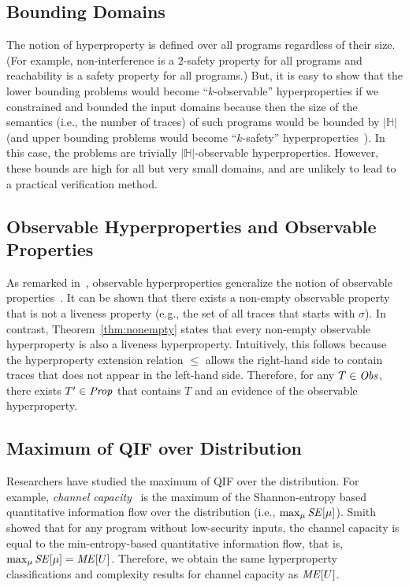 \documentclass[]{eptcs}
\begin{document}
\subsection{Bounding Domains}

\label{sec:bounddomain}
The notion of hyperproperty is defined over all programs regardless of
their size. (For example, non-interference is a $2$-safety property
for all programs and reachability is a safety property for all
programs.) But, it is easy to show that the lower bounding problems
would become ``$k$-observable'' hyperproperties if we constrained and
bounded the input domains because then the size of the semantics
(i.e., the number of traces) of such programs would be bounded by
$|\mathbb{H}|$ (and upper bounding problems would become
``$k$-safety''
hyperproperties~\cite{DBLP:conf/esorics/YasuokaT10}). In this case,
the problems are trivially $|\mathbb{H}|$-observable hyperproperties.
However, these bounds are high for all but very small domains, and are
unlikely to lead to a practical verification method.


\subsection{Observable Hyperproperties and Observable Properties}
As remarked in~\cite{DBLP:journals/jcs/ClarksonS10}, observable
hyperproperties generalize the notion of observable
properties~\cite{DBLP:journals/apal/Abramsky91}.  It can be shown that
there exists a non-empty observable property that is not a liveness
property (e.g., the set of all traces that starts with $\sigma$).  In
contrast, Theorem~\ref{thm:nonempty} states that every non-empty
observable hyperproperty is also a liveness hyperproperty.
Intuitively, this follows because the hyperproperty extension relation
$\le$ allows the right-hand side to contain traces that does not
appear in the left-hand side.  Therefore, for any $T\in {\it Obs}$,
there exists $T'\in{\it Prop}$ that contains $T$ and an evidence of
the observable hyperproperty.

\subsection{Maximum of QIF over Distribution}

\label{sec:maxqif}

Researchers have studied the maximum of QIF over the distribution.
For example, {\em channel
  capacity}~\cite{mccamant:pldi2008,malacaria08,NMS2009} is the
maximum of the Shannon-entropy based quantitative information flow
over the distribution (i.e., $\max_\mu{\it SE}[\mu]$).
Smith~\cite{smith09} showed that for any program without low-security
inputs, the channel capacity is equal to the min-entropy-based
quantitative information flow, that is, $\max_\mu{\it SE}[\mu] = {\it
  ME}[U]$.  Therefore, we obtain the same hyperproperty
classifications and complexity results for channel capacity as ${\it
  ME}[U]$.
\end{document}
